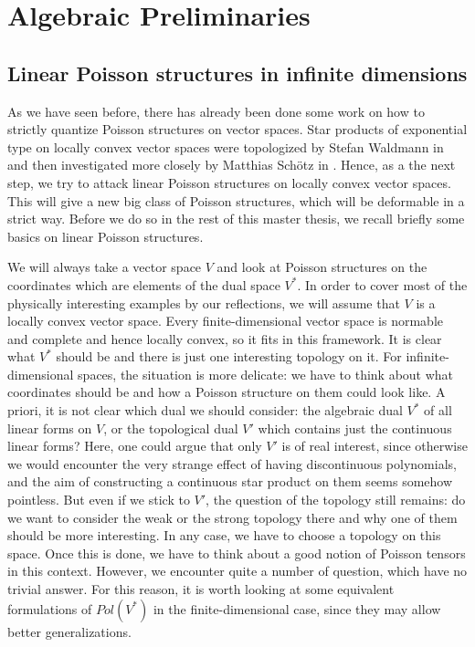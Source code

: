 
%
%

\chapter{Algebraic Preliminaries}


\section{Linear Poisson structures in infinite dimensions}
\label{sec:chap3_LinearPoisson}

As we have seen before, there has already been done some work on how to 
strictly quantize Poisson structures on vector spaces. Star products of
exponential type on locally convex vector spaces were topologized by Stefan 
Waldmann in \cite{waldmann:2014a} and then investigated more closely by 
Matthias Schötz in \cite{schoetz:2014a}. Hence, as a the next step, we try
to attack linear Poisson structures on locally convex vector spaces. This 
will give a new big class of Poisson structures, which will be deformable in a 
strict way. Before we do so in the rest of this master thesis, we recall 
briefly some basics on linear Poisson structures.


We will always take a vector space $V$ and look at Poisson structures on the 
coordinates which are elements of the dual space $V^*$. In order to cover most 
of the physically interesting examples by our reflections, we will assume that 
$V$ is a locally convex vector space. Every finite-dimensional vector space is 
normable and complete and hence locally convex, so it fits in this framework. 
It is clear what $V^*$ should be and there is just one interesting topology on 
it. For infinite-dimensional spaces, the situation is more delicate:
we have to think about what coordinates should be and how a Poisson structure 
on them could look like. A priori, it is not clear which dual we should 
consider: the algebraic dual $V^*$ of all linear forms on $V$, or the 
topological dual $V'$ which contains just the continuous linear forms? Here, 
one could argue that only $V'$ is of real interest, since otherwise we would 
encounter the very strange effect of having discontinuous polynomials, and the 
aim of constructing a continuous star product on them seems somehow pointless. 
But even if we stick to $V'$, the question of the topology still remains: 
do we want to consider the weak or the strong topology there and why one of 
them should be more interesting. In any case, we have to choose a topology on 
this space. Once this is done, we have to think about a good notion of Poisson 
tensors in this context. However, we encounter quite a number of question,
which have no trivial answer. For this reason, it is worth looking at some 
equivalent formulations of $Pol(V^*)$ in the finite-dimensional case, since 
they may allow better generalizations.


